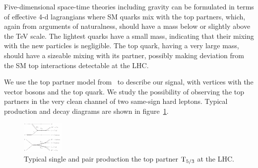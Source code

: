 Five-dimensional space-time theories including gravity can be formulated in
terms of effective 4-d lagrangians where SM quarks mix with the top
partners, which, again from arguments of naturalness, should have a mass below or
slightly above the \unit[]{TeV} scale.
The lightest quarks have a small mass, indicating that their mixing with the
new particles is negligible. The top quark, having a very large mass, should have
a sizeable mixing with its partner, possibly making deviation
from the SM top interactions detectable at the LHC.

We use the top partner model from~\cite{Mrazek:2009yu} to describe our
signal, with vertices with the vector bosons and the top quark. 
We study the possibility of observing the top partners in the very clean
channel of two same-sign hard leptons. Typical production and decay diagrams
are shown in figure~\ref{fig:T53_production}.

\begin{figure}[htb]
    \centering
    \includegraphics[width=\textwidth]{images/pdf/T53_production}
    \caption{Typical single and pair production the top partner $\mathrm{T}_{5/3}$ at the
    LHC.}
    \label{fig:T53_production}
\end{figure}
